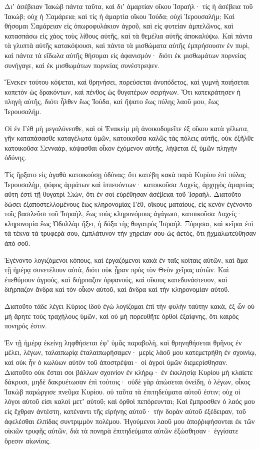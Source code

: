 \begin{spacing}{1.1}
\begin{multicols}{2}
Διʼ ἀσέβειαν Ἰακὼβ πάντα ταῦτα, καὶ διʼ ἁμαρτίαν οἴκου Ἰσραήλ· τίς ἡ ἀσέβεια τοῦ Ἰακώβ; οὐχ ἡ Σαμάρεια; καὶ τίς ἡ ἁμαρτία οἴκου Ἰούδα; οὐχὶ Ἱερουσαλήμ;
Καὶ θήσομαι Σαμάρειαν εἰς ὀπωροφυλάκιον ἀγροῦ, καὶ εἰς φυτείαν ἀμπελῶνος, καὶ κατασπάσω εἰς χάος τοὺς λίθους αὐτῆς, καὶ τὰ θεμέλια αὐτῆς ἀποκαλύψω.
Καὶ πάντα τὰ γλυπτὰ αὐτῆς κατακόψουσι, καὶ πάντα τὰ μισθώματα αὐτῆς ἐμπρήσουσιν ἐν πυρὶ, καὶ πάντα τὰ εἴδωλα αὐτῆς θήσομαι εἰς ἀφανισμόν· διότι ἐκ μισθωμάτων πορνείας συνήγαγε, καὶ ἐκ μισθωμάτων πορνείας συνέστρεψεν.

Ἕνεκεν τούτου κόψεται, καὶ θρηνήσει, πορεύσεται ἀνυπόδετος, καὶ γυμνὴ ποιήσεται κοπετὸν ὡς δρακόντων, καὶ πένθος ὡς θυγατέρων σειρήνων.
Ὅτι κατεκράτησεν ἡ πληγὴ αὐτῆς, διότι ἦλθεν ἕως Ἰούδα, καὶ ἥψατο ἕως πύλης λαοῦ μου, ἕως Ἱερουσαλήμ.

Οἱ ἐν Γὲθ μὴ μεγαλύνεσθε, καὶ οἱ Ἐνακεὶμ μὴ ἀνοικοδομεῖτε ἐξ οἴκου κατὰ γέλωτα, γῆν καταπάσασθε καταγέλωτα ὑμῶν,
κατοικοῦσα καλῶς τὰς πόλεις αὐτῆς, οὐκ ἐξῆλθε κατοικοῦσα Σενναὰρ, κόψασθαι οἶκον ἐχόμενον αὐτῆς, λήψεται ἐξ ὑμῶν πληγὴν ὀδύνης.

Τίς ἥρξατο εἰς ἀγαθὰ κατοικούσῃ ὀδύνας; ὅτι κατέβη κακὰ παρὰ Κυρίου ἐπὶ πύλας Ἱερουσαλὴμ,
ψόφος ἁρμάτων καὶ ἱππευόντων· κατοικοῦσα Λαχεὶς, ἀρχηγὸς ἁμαρτίας αὕτη ἐστὶ τῇ θυγατρὶ Σιὼν, ὅτι ἐν σοὶ εὑρέθησαν ἀσέβειαι τοῦ Ἰσραήλ.
Διατοῦτο δώσει ἐξαποστελλομένους ἕως κληρονομίας Γὲθ, οἴκους ματαίους, εἰς κενὸν ἐγένοντο τοῖς βασιλεῦσι τοῦ Ἰσραὴλ,
ἕως τοὺς κληρονόμους ἀγάγωσι, κατοικοῦσα Λαχείς· κληρονομία ἕως Ὀδολλὰμ ἥξει, ἡ δόξα τὴς θυγατρὸς Ἰσραήλ.
Ξύρησαι, καὶ κεῖραι ἐπὶ τὰ τέκνα τὰ τρυφερά σου, ἐμπλάτυνον τὴν χηρείαν σου ὡς ἀετὸς, ὅτι ᾐχμαλωτεύθησαν ἀπὸ σοῦ.

Ἐγένοντο λογιζόμενοι κόπους, καὶ ἐργαζόμενοι κακὰ ἐν ταῖς κοίταις αὐτῶν, καὶ ἅμα τῇ ἡμέρᾳ συνετέλουν αὐτὰ, διότι οὐκ ᾖραν πρὸς τὸν Θεὸν χεῖρας αὐτῶν.
Καὶ ἐπεθύμουν ἀγρούς, καὶ διήρπαζον ὀρφανούς, καὶ οἴκους κατεδυνάστευον, καὶ διήρπαζον ἄνδρα καὶ τὸν οἶκον αὐτοῦ, καὶ ἄνδρα καὶ τὴν κληρονομίαν αὐτοῦ.

Διατοῦτο τάδε λέγει Κύριος ἰδοὺ ἐγὼ λογίζομαι ἐπὶ τὴν φυλὴν ταύτην κακὰ, ἐξ ὧν οὐ μὴ ἄρητε τοὺς τραχήλους ὑμῶν, καὶ οὐ μὴ πορευθῆτε ὀρθοὶ ἐξαίφνης, ὅτι καιρὸς πονηρός ἐστιν.

Ἐν τῇ ἡμέρᾳ ἐκείνῃ ληφθήσεται ἐφʼ ὑμᾶς παραβολὴ, καὶ θρηνηθήσεται θρῆνος ἐν μέλει, λέγων, ταλαιπωρίᾳ ἐταλαιπωρήσαμεν· μερὶς λὰοῦ μου κατεμετρήθη ἐν σχοινίῳ, καὶ οὐκ ἦν ὁ κωλύων αὐτὸν τοῦ ἀποστρέψαι· οἱ ἀγροὶ ὑμῶν διεμερίσθησαν.
Διατοῦτο οὐκ ἔσται σοι βάλλων σχοινίον ἐν κλήρῳ· ἐν ἐκκλησίᾳ Κυρίου
μὴ κλαίετε δάκρυσι, μηδὲ δακρυέτωσαν ἐπὶ τούτοις· οὐδὲ γὰρ ἀπώσεται ὀνείδη,
ὁ λέγων, οἶκος Ἰακὼβ παρώργισε πνεῦμα Κυρίου. οὐ ταῦτα τὰ ἐπιτηδεύματα αὐτοῦ ἐστιν; οὐχ οἱ λόγοι αὐτοῦ εἰσι καλοὶ μετʼ αὐτοῦ; καὶ ὀρθοὶ πεπόρευνται;
Καὶ ἔμπροσθεν ὁ λαός μου εἰς ἔχθραν ἀντέστη, κατέναντι τῆς εἰρήνης αὐτοῦ· τὴν δορὰν αὐτοῦ ἐξέδειραν, τοῦ ἀφελέσθαι ἐλπίδας συντριμμὸν πολέμου.
Ἡγούμενοι λαοῦ μου ἀποῤῥιφήσονται ἐκ τῶν οἰκιῶν τρυφῆς αὐτῶν, διὰ τὰ πονηρὰ ἐπιτηδεύματα αὐτῶν ἐξώσθησαν· ἐγγίσατε ὄρεσιν αἰωνίοις.


\end{multicols}
\end{spacing}
